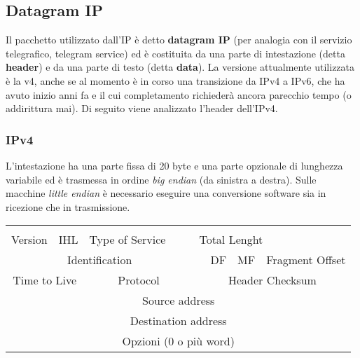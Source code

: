 \documentclass{article}
\begin{document}
        \subsection{Datagram IP}
        Il pacchetto utilizzato dall’IP è detto \textbf{datagram IP} (per analogia con il servizio telegrafico,
        telegram service) ed è costituita da una parte di intestazione (detta \textbf{header}) e da una parte di
        testo (detta \textbf{data}). La versione attualmente utilizzata è la v4, anche se al momento è in corso
        una transizione da IPv4 a IPv6, che ha avuto inizio anni fa e il cui completamento richiederà
        ancora parecchio tempo (o addirittura mai). Di seguito viene analizzato l’header dell’IPv4.
    
            \subsubsection{IPv4}
            L’intestazione ha una parte fissa di 20 byte e una parte opzionale di lunghezza variabile ed è
            trasmessa in ordine \textit{big endian} (da sinistra a destra). Sulle macchine \textit{little endian} è necessario
            eseguire una conversione software sia in ricezione che in trasmissione.\\
           
            
            \begin{tabular}{|l|l|l|l|l|l|l|l|l|l|l|l|l|l|l|l|l|l|l|l|l|l|l|l|l|l|l|l|l|l|l|l|}
                \hline
                & & & & & & & & & & & & & & & & & & & & & & & & & & & & & & & \\
                \hline
                \multicolumn{32}{l}{} \\
                \hline
                \multicolumn{4}{|c|}{Version} & \multicolumn{4}{|c|}{IHL} & \multicolumn{6}{|c|}{Type of Service} & & & \multicolumn{16}{|l|}{Total Lenght}\\
                \hline
                \multicolumn{16}{|c|}{Identification} & & DF & MF & \multicolumn{13}{|c|}{Fragment Offset} \\
                \hline
                \multicolumn{8}{|c|}{Time to Live} & \multicolumn{8}{|c|}{Protocol} & \multicolumn{16}{|c|}{Header Checksum}\\
                \hline
                \multicolumn{32}{|c|}{Source address}\\
                \hline
                \multicolumn{32}{|c|}{Destination address}\\
                \hline
                \multicolumn{32}{|c|}{Opzioni (0 o più word)}\\
                \hline
            \end{tabular}
\end{document}
